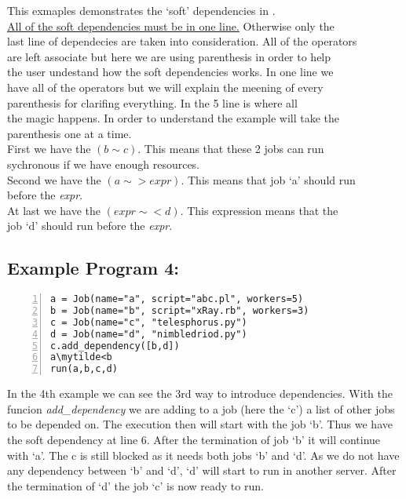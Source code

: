 This exmaples demonstrates the `soft' dependencies in \lang{}.\\
\underline{All of the soft dependencies must be in one line.} Otherwise only the\\
last line of dependecies are taken into consideration. All of the operators\\
are left associate but here we are using parenthesis in order to help\\
the user undestand how the soft dependencies works. In one line we \\
have all of the operators but we will explain the meening of every \\
parenthesis for clarifing everything. In the 5 line is where all \\
the magic happens. In order to understand the example will take the\\
parenthesis one at a time.\\
First we have the $(b\sim c)$. This means that these 2 jobs can run\\
sychronous if we have enough resources. \\
Second we have the $(a\sim>expr)$. This means that job `a' should run\\
before the \textit{expr}. \\
At last we have the $(expr\sim<d)$. This expression means that the \\
job `d' should run before the \textit{expr}.

\subsection*{Example Program 4:}
\begin{Verbatim}[numbers=left,commandchars=\\\{\}]
a = Job(name="a", script="abc.pl", workers=5)
b = Job(name="b", script="xRay.rb", workers=3)
c = Job(name="c", "telesphorus.py")
d = Job(name="d", "nimbledriod.py")
c.add_dependency([b,d])
a\mytilde<b
run(a,b,c,d)
\end{Verbatim}

In the 4th example we can see the 3rd way to introduce dependencies.
With the funcion \textit{add\_dependency} we are adding to a job (here the `c')
a list of other jobs to be depended on. The execution then will start with the job
`b'. Thus we have the soft dependency at line 6. After the termination of job `b'
it will continue with `a'. The c is still blocked as it needs both jobs `b' and `d'.
As we do not have any dependency between `b' and `d', `d' will start to run in another
server. After the termination of `d' the job `c' is now ready to run.

